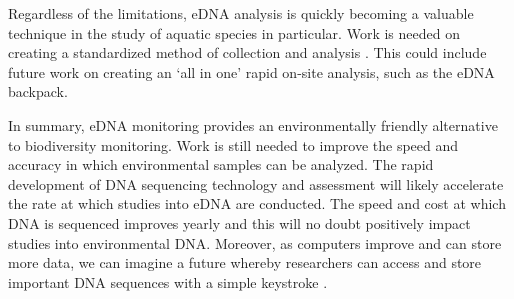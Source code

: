 Regardless of the limitations, eDNA analysis is quickly becoming a valuable technique in the study of aquatic species in particular. Work is needed on creating a standardized method of collection and analysis \citep{limitations}. This could include future work on creating an `all in one' rapid on-site analysis, such as the eDNA backpack.

\vspace{5mm}

In summary, eDNA monitoring provides an environmentally friendly  alternative to biodiversity monitoring. Work is still needed to improve the speed and accuracy in which environmental samples can be analyzed.  The rapid development of DNA sequencing technology and assessment will likely accelerate the rate at which studies into eDNA are conducted. The speed and cost at which DNA is sequenced improves yearly and this will no doubt positively impact studies into environmental DNA. Moreover, as computers improve and can store more data, we can imagine a future whereby researchers can access and store important DNA sequences with a simple keystroke \citep{ecologicalfuture}.

